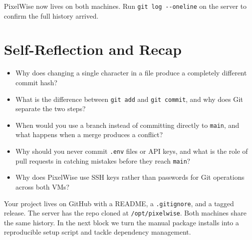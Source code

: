 PixelWise now lives on both machines. Run \texttt{git log -{}-oneline} on the server to confirm the full history arrived.



\newpage
\section{Self-Reflection and Recap}

\begin{itemize}
    \item Why does changing a single character in a file produce a completely different commit hash?
    \item What is the difference between \texttt{git add} and \texttt{git commit}, and why does Git separate the two steps?
    \item When would you use a branch instead of committing directly to \texttt{main}, and what happens when a merge produces a conflict?
    \item Why should you never commit \texttt{.env} files or API keys, and what is the role of pull requests in catching mistakes before they reach \texttt{main}?
    \item Why does PixelWise use SSH keys rather than passwords for Git operations across both VMs?
\end{itemize}

 Your project lives on GitHub with a README, a \texttt{.gitignore}, and a tagged release.
The server has the repo cloned at \texttt{/opt/pixelwise}. Both machines share the same history.
In the next block we turn the manual package installs into a reproducible setup script and tackle dependency management.
